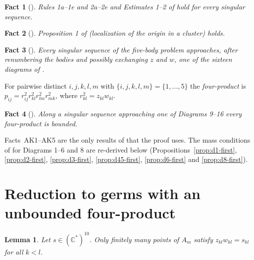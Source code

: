 \documentclass[11pt]{amsart}
\newtheorem{lemma}[theorem]{Lemma}
\newtheorem{fact}{Fact}
\theoremstyle{definition}
\theoremstyle{remark}
\newcommand{\C}{\mathbb{C}}
\begin{document}
\begin{fact}[{\cite[\S3]{AK}}]\label{fact:rules}
Rules 1a--1e and 2a--2e and Estimates 1--2 of \cite[\S3]{AK} hold for every singular sequence.
\end{fact}

\begin{fact}[{\cite[Prop.~1]{AK}}]\label{fact:prop1}
Proposition 1 of \cite{AK} (localization of the origin in a cluster) holds.
\end{fact}

\begin{fact}[{\cite[\S7]{AK}}]\label{fact:fig11}
Every singular sequence of the five-body problem approaches, after renumbering the bodies and
possibly exchanging $z$ and $w$, one of the sixteen diagrams of \cite[Fig.~11]{AK}.
\end{fact}

For pairwise distinct $i,j,k,l,m$ with $\{i,j,k,l,m\}=\{1,\dots,5\}$ the \emph{four-product} is
$p_{ij}=r_{ij}^2r_{kl}^2r_{lm}^2r_{mk}^2$, where $r_{kl}^2=z_{kl}w_{kl}$.

\begin{fact}[{\cite[Prop.~8]{AK}}]\label{fact:prop8}
Along a singular sequence approaching one of Diagrams 9--16 every four-product is bounded.
\end{fact}

Facts~AK1--AK5 are the only results of \cite{AK} that the proof uses.  The mass conditions of
\cite[\S8]{AK} for Diagrams 1--6 and 8 are re-derived below
(Propositions~\ref{prop:d1-first}, \ref{prop:d2-first}, \ref{prop:d3-first},
\ref{prop:d45-first}, \ref{prop:d6-first} and \ref{prop:d8-first}).


\section{Reduction to germs with an unbounded four-product}\label{sec:reduction}

\begin{lemma}\label{lem:distances}
Let $s\in(\C^*)^{10}$.  Only finitely many points of $A_m$ satisfy $z_{kl}w_{kl}=s_{kl}$ for all
$k<l$.
\end{lemma}
\end{document}
